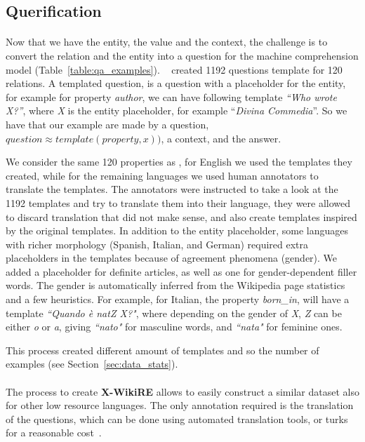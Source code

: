 \newpage
\subsection{Querification}
\paragraph{}
Now that we have the entity, the value and the context, the challenge is to convert the relation and the entity into a question for the machine comprehension model (Table~\ref{table:qa_examples}). ~\cite{levy2017zero} created 1192 questions template for 120 relations. A templated question, is a question with a placeholder for the entity, for example for property \textit{author}, we can have following template \textit{``Who wrote X?''}, where \textit{X} is the entity placeholder, for example ``\textit{Divina Commedia}''. So we have that our example are made by a question,  $question \approx template(property,x))$, a context, and the answer. 

We consider the same 120 properties as \cite{levy2017zero}, for English we used the templates they created, while for the remaining languages we used human annotators to translate the templates. The annotators were instructed to take a look at the 1192 templates and try to translate them into their language, they were allowed to discard translation that did not make sense, and also create templates inspired by the original templates. 
In  addition  to  the  entity placeholder, some languages with richer morphology  (Spanish,  Italian,  and  German)  required  extra placeholders in the templates because of agreement  phenomena  (gender).    We  added  a  placeholder  for  definite  articles,  as  well  as  one  for gender-dependent filler words. The gender is automatically inferred from the Wikipedia page statistics and a few heuristics. For example, for Italian, the property \textit{born\_in}, will have a template \textit{``Quando è natZ X?"}, where depending on the gender of \textit{X}, \textit{Z} can be either \textit{o} or \textit{a}, giving \textit{``nato"} for masculine words, and \textit{``nata"} for feminine ones.

This process created different amount of templates and so the number of examples (see Section~\ref{sec:data_stats}). 



\paragraph{}
The process to create \textbf{X-WikiRE} allows to easily construct a similar dataset also for other low resource languages. The only annotation required is the translation of the questions, which can be done using automated translation tools, or turks for a reasonable cost~\citep{levy2017zero}.


